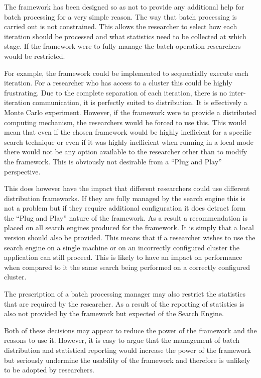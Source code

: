The framework has been designed so as not to provide any additional help for batch processing for a very simple reason.
The way that batch processing is carried out is not constrained.
This allows the researcher to select how each iteration should be processed and what statistics need to be collected at which stage.
If the framework were to fully manage the batch operation researchers would be restricted.

For example, the framework could be implemented to sequentially execute each iteration.
For a researcher who has access to a cluster this could be highly frustrating.
Due to the complete separation of each iteration, there is no inter-iteration communication, it is perfectly suited to distribution.
It is effectively a Monte Carlo experiment.
However, if the framework were to provide a distributed computing mechanism, the researchers would be forced to use this.
This would mean that even if the chosen framework would be highly inefficient for a specific search technique or even if it was highly inefficient when running in a local mode there would not be any option available to the researcher other than to modify the framework.
This is obviously not desirable from a ``Plug and Play'' perspective.

This does however have the impact that different researchers could use different distribution frameworks.
If they are fully managed by the search engine this is not a problem but if they require additional configuration it does detract form the ``Plug and Play'' nature of the framework.
As a result a recommendation is placed on all search engines produced for the framework.
It is simply that a local version should also be provided.
This means that if a researcher wishes to use the search engine on a single machine or on an incorrectly configured cluster the application can still proceed.
This is likely to have an impact on performance when compared to it the same search being performed on a correctly configured cluster.

The prescription of a batch processing manager may also restrict the statistics that are required by the researcher.
As a result of the reporting of statistics is also not provided by the framework but expected of the Search Engine.

Both of these decisions may appear to reduce the power of the framework and the reasons to use it.
However, it is easy to argue that the management of batch distribution and statistical reporting would increase the power of the framework but seriously undermine the usability of the framework and therefore is unlikely to be adopted by researchers.

